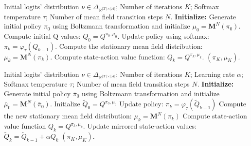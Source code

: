 \documentclass[10pt,twocolumn,letterpaper]{article}
\theoremstyle{definition}
\theoremstyle{remark}
\newcommand{\states}{\mathcal{X}}
\newcommand{\actions}{\mathcal{A}}
\begin{document}
\begin{algorithm}[H]
\small
\caption{Boltzmann Policy Iteration}
\label{algo:boltzmannpi}
\begin{algorithmic}[1]
    \REQUIRE Initial logits' distribution $\nu\in\Delta_{\mathbb{R}^{|\states|\times|\actions|}}$; Number of iterations $K$; Softmax temperature $\tau$; Number of mean field transition steps $N$.
    \STATE \textbf{Initialize:} Generate initial policy $\pi_0$ using Boltzmann transformation and initialize $\mu_0=\mathbf{M}^N(\pi_0)$.
    \STATE Compute initial Q-values: $Q_0 = Q^{\pi_0, \mu_0}$.
        \STATE Update policy using softmax: $\pi_k = \varphi_{\tau}(Q_{k-1})$.
        \STATE Compute the stationary mean field distribution: $\mu_k = \mathbf{M}^N(\pi_k)$.
        \STATE Compute state-action value function: $Q_k = Q^{\pi_k, \mu_k}$.
    \ENDFOR
    \ENSURE $(\pi_K, \mu_K)$.
\end{algorithmic}
\end{algorithm}


\begin{algorithm}[H]
\small
\caption{Online Mirror Descent (OMD)}
\label{algo:omd}
\begin{algorithmic}[1]
    \REQUIRE Initial logits' distribution $\nu\in\Delta_{\mathbb{R}^{|\states|\times|\actions|}}$; Number of iterations $K$; Learning rate $\alpha$; Softmax temperature $\tau$; Number of mean field transition steps $N$.
    \STATE \textbf{Initialize:} Generate initial policy $\bar\pi_0$ using Boltzmann transformation and initialize $\bar\mu_0=\mathbf{M}^N(\bar\pi_0)$. Initialize $\tilde Q_0 = Q^{\pi_0, \mu_0}$
        \STATE Update policy:
            $\pi_{k} = \varphi_{\tau}(\tilde{Q}_{k-1})$
        \STATE Compute the new stationary mean field distribution:
            $\mu_{k} = \mathbf{M}^N(\pi_{k})$
        \STATE Compute state-action value function $Q_{k} = Q^{\pi_k, \mu_k}$.
        \STATE Update mirrored state-action values:
            $\tilde{Q}_{k} = \tilde{Q}_{k-1} + \alpha Q_{k}$
    \ENDFOR
    \ENSURE $(\pi_K, \mu_K)$.
\end{algorithmic}
\end{algorithm}
\end{document}
